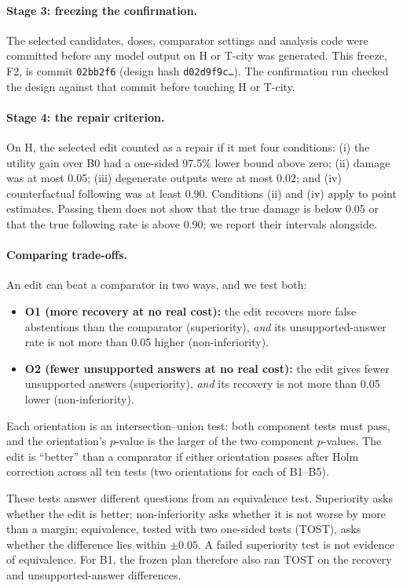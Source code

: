 \paragraph{Stage 3: freezing the confirmation.}
The selected candidates, doses, comparator settings and analysis code were committed before any model output on H
or T-city was generated. This freeze, F2, is commit \texttt{02bb2f6} (design hash \texttt{d02d9f9c\ldots}). The
confirmation run checked the design against that commit before touching H or T-city.

\paragraph{Stage 4: the repair criterion.}
On H, the selected edit counted as a repair if it met four conditions: (i) the utility gain over B0 had a one-sided
97.5\% lower bound above zero; (ii) damage was at most 0.05; (iii) degenerate outputs were at most 0.02; and (iv)
counterfactual following was at least 0.90. Conditions (ii) and (iv) apply to point estimates. Passing them does not
show that the true damage is below 0.05 or that the true following rate is above 0.90; we report their intervals
alongside.

\paragraph{Comparing trade-offs.}
An edit can beat a comparator in two ways, and we test both:
\begin{itemize}[leftmargin=*]
  \item \textbf{O1 (more recovery at no real cost):} the edit recovers more false abstentions than the comparator
        (superiority), \emph{and} its unsupported-answer rate is not more than 0.05 higher (non-inferiority).
  \item \textbf{O2 (fewer unsupported answers at no real cost):} the edit gives fewer unsupported answers
        (superiority), \emph{and} its recovery is not more than 0.05 lower (non-inferiority).
\end{itemize}
Each orientation is an intersection--union test: both component tests must pass, and the orientation's $p$-value
is the larger of the two component $p$-values. The edit is ``better'' than a comparator if either orientation passes
after Holm correction across all ten tests (two orientations for each of B1--B5).

These tests answer different questions from an equivalence test. Superiority asks whether the edit is better;
non-inferiority asks whether it is not worse by more than a margin; equivalence, tested with two one-sided tests
(TOST), asks whether the difference lies within $\pm 0.05$. A failed superiority test is not evidence of
equivalence. For B1, the frozen plan therefore also ran TOST on the recovery and
unsupported-answer differences.

